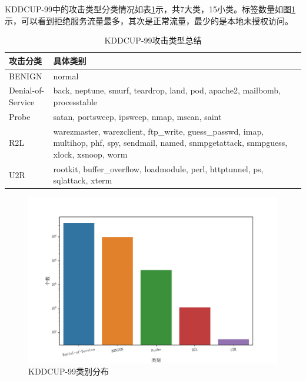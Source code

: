 KDDCUP-99中的攻击类型分类情况如表\ref{table:kdd_attack_types}示，共7大类，15小类。标签数量如图\ref{fig:kdd99_category}示，可以看到拒绝服务流量最多，其次是正常流量，最少的是本地未授权访问。

\begin{table}[htb]
  \centering
  \caption{KDDCUP-99攻击类型总结}
  \begin{tabular}{p{0.15\linewidth}p{0.85\linewidth}}
    \toprule
    \textbf{攻击分类}& \textbf{具体类别}\\
    \midrule
    BENIGN & normal \\
    Denial-of-Service & back, neptune, smurf, teardrop, land, pod, apache2, mailbomb, processtable \\
    Probe & satan, portsweep, ipsweep, nmap, mscan, saint \\
    R2L & warezmaster, warezclient, ftp\_write, guess\_passwd, imap, multihop, phf, spy, sendmail, named, snmpgetattack, snmpguess, xlock, xsnoop, worm \\
    U2R & rootkit, buffer\_overflow, loadmodule, perl, httptunnel, ps, sqlattack, xterm \\
    \bottomrule
  \end{tabular}
  \label{table:kdd_attack_types}
\end{table}

\begin{figure}[htb]
\centering %
\includegraphics[width=.95\linewidth]{img/preprocessing/kdd99_category.pdf} %
\caption{KDDCUP-99类别分布}
\label{fig:kdd99_category} %
\end{figure}%

